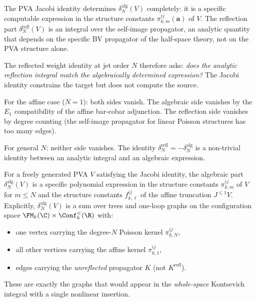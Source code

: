 \begin{remark}
\label{rem:jacobi-controls}
The PVA Jacobi identity determines
$\delta_N^{\mathrm{alg}}(V)$ completely: it is a specific
computable expression in the structure constants
$\pi^{ij}_{k,m}(\boldsymbol a)$ of $V$. The reflection part
$\delta_N^{\mathrm{refl}}(V)$ is an integral over the self-image
propagator, an analytic quantity that depends on the specific BV
propagator of the half-space theory, not on the PVA structure
alone.

The reflected weight identity at jet order $N$ therefore asks:
\emph{does the analytic reflection integral match the algebraically
determined expression?} The Jacobi identity constrains the target
but does not compute the source.

For the affine case ($N=1$): both sides vanish. The algebraic side
vanishes by the $E_1$ compatibility of the affine bar-cobar
adjunction. The reflection side vanishes by degree counting (the
self-image propagator for linear Poisson structures has too many
edges).

For general $N$: neither side vanishes. The identity
$\delta_N^{\mathrm{refl}}=-\delta_N^{\mathrm{alg}}$ is a
non-trivial identity between an analytic integral and an algebraic
expression.
\end{remark}

\begin{theorem}
\label{thm:algebraic-determination}
For a freely generated PVA $V$ satisfying the Jacobi identity, the
algebraic part $\delta_N^{\mathrm{alg}}(V)$ is a specific polynomial
expression in the structure constants $\pi^{ij}_{k,m}$ of $V$ for
$m\le N$ and the structure constants $f^{ij}_{k,\ell}$ of the affine
truncation $J^{\le 1}V$. Explicitly, $\delta_N^{\mathrm{alg}}(V)$
is a sum over trees and one-loop graphs on the configuration space
$\FM_k(\C)\times\Conf_k^{<}(\R)$ with:
\begin{itemize}
\item one vertex carrying the degree-$N$ Poisson kernel
 $\pi^{ij}_{k,N}$,
\item all other vertices carrying the affine kernel
 $\pi^{ij}_{k,1}$,
\item edges carrying the \emph{unreflected} propagator $K$
 (not $K^{\mathrm{refl}}$).
\end{itemize}
These are exactly the graphs that would appear in the
\emph{whole-space} Kontsevich integral with a single nonlinear
insertion.
\end{theorem}

